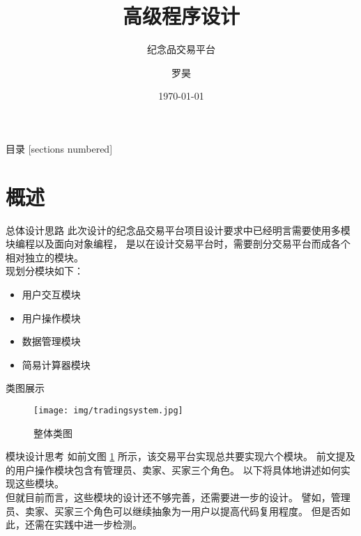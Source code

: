 \documentclass[10pt]{beamer}
\title{高级程序设计}
\subtitle{纪念品交易平台}
\date{\today}
\author{罗昊}
\institute{计算机科学与技术系 191220073}
\begin{document}
\maketitle

\begin{frame}{目录}
    [sections numbered]
    \tableofcontents[hideallsubsections]
\end{frame}

\section{概述}

\begin{frame}{总体设计思路}
    此次设计的纪念品交易平台项目设计要求中已经明言需要使用多模块编程以及面向对象编程，
    是以在设计交易平台时，需要剖分交易平台而成各个相对独立的模块。\\
    现划分模块如下：\\
    \begin{itemize}
        \item 用户交互模块
        \item 用户操作模块
        \item 数据管理模块
        \item 简易计算器模块
    \end{itemize}
\end{frame}

\begin{frame}{类图展示}
    \begin{figure}[H]
        \centering
        \texttt{[image: img/tradingsystem.jpg]}
        \caption{整体类图}
        \label{UmlClass}
    \end{figure}
\end{frame}

\begin{frame}{模块设计思考}
    如前文图 \ref{UmlClass} 所示，该交易平台实现总共要实现六个模块。
    前文提及的用户操作模块包含有管理员、卖家、买家三个角色。
    以下将具体地讲述如何实现这些模块。\\
    但就目前而言，这些模块的设计还不够完善，还需要进一步的设计。
    譬如，管理员、卖家、买家三个角色可以继续抽象为一用户以提高代码复用程度。
    但是否如此，还需在实践中进一步检测。\\
\end{frame}
\end{document}
